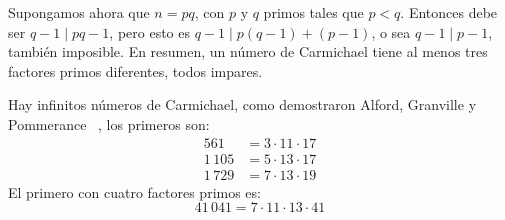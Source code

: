   Supongamos ahora que \(n = p q\), con \(p\) y \(q\) primos
  tales que \(p < q\).
  Entonces debe ser \(q - 1 \mid p q - 1\),
  pero esto es \(q - 1 \mid p (q - 1) + (p - 1)\),
  o sea \(q - 1 \mid p - 1\),
  también imposible.
  En resumen,
  un número de Carmichael
  tiene al menos tres factores primos diferentes,
  todos impares.

  Hay infinitos números de Carmichael,
  como demostraron Alford, Granville y Pommerance~%
    \cite{alford94:_there_infin_many_carmic_number},
  los primeros son:
  \begin{align*}
       561
      &= 3 \cdot 11 \cdot 17 \\
    1\,105
      &= 5 \cdot 13 \cdot 17 \\
    1\,729
      &= 7 \cdot 13 \cdot 19
  \end{align*}
  El primero con cuatro factores primos es:
  \begin{equation*}
    41\,041 = 7 \cdot 11 \cdot 13 \cdot 41
  \end{equation*}

